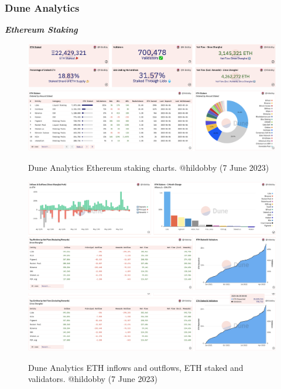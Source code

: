 \documentclass[UTF8]{article}
\begin{document}
\clearpage
\subsubsection*{Dune Analytics}
\textit{\textbf{Ethereum Staking}}
\begin{figure}[htbp]
\begin{center}
\includegraphics[width=\linewidth]{images/hildobby1}\\
\includegraphics[width=\linewidth]{images/hildobby2}
\caption{Dune Analytics Ethereum staking charts. @hildobby  (7 June 2023)}
\label{fig:hildobby1}
\end{center}
\end{figure}

\begin{figure}[htbp]
\begin{center}
\includegraphics[width=\linewidth]{images/hildobby3}\\
\includegraphics[width=\linewidth]{images/hildobby4}
\caption{Dune Analytics ETH inflows and outflows, ETH staked and validators. @hildobby  (7 June 2023)}
\label{fig:hildobby3}
\end{center}
\end{figure}
\end{document}

